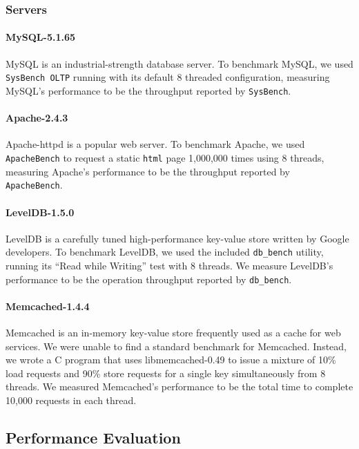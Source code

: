 \documentclass[preprint,9pt]{sigplanconf}
\begin{document}
\subsubsection{Servers}


\paragraph{MySQL-5.1.65} MySQL is an industrial-strength database
server. To benchmark MySQL, we used {\tt SysBench OLTP} running with its
default 8 threaded configuration, measuring MySQL's performance to be the
throughput reported by {\tt SysBench}.  

\paragraph{Apache-2.4.3} 
Apache-httpd is a popular web server.  To benchmark Apache, we used {\tt
ApacheBench} to request a static {\tt html} page 1,000,000 times using 8
threads, measuring Apache's performance to be the throughput reported by {\tt
ApacheBench}.  

\paragraph{LevelDB-1.5.0}
LevelDB is a carefully tuned high-performance key-value store written by Google
developers. To benchmark LevelDB, we used the included {\tt db\_bench} utility,
running its ``Read while Writing'' test with 8 threads.  We measure LevelDB's
performance to be the operation throughput reported by {\tt db\_bench}.

\paragraph{Memcached-1.4.4}
Memcached is an in-memory key-value store frequently used as a cache for web
services.  We were unable to find a standard benchmark for Memcached.  Instead,
we wrote a C program that uses libmemcached-0.49 to issue a
mixture of 10\% load requests and 90\% store requests for a single key 
simultaneously from 8 threads.  We measured Memcached's performance to be the
total time to complete 10,000 requests in each thread.



\subsection{Performance Evaluation}
\label{sec:eval:perf}
\end{document}
